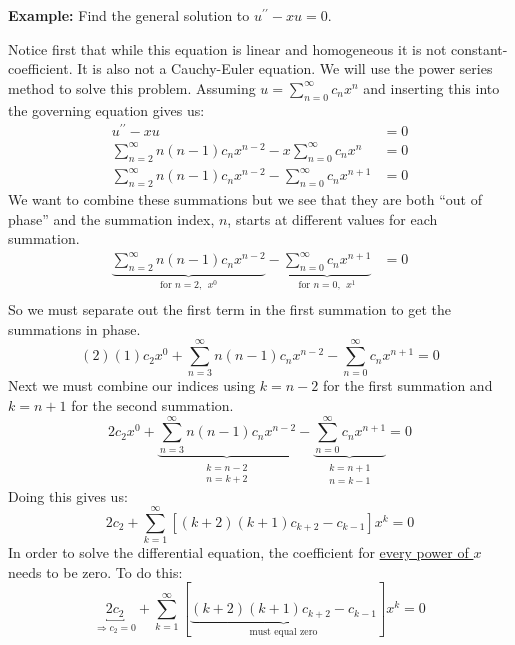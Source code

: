\vspace{3.0cm}
\noindent\textbf{Example:} Find the general solution to $u^{\prime \prime}-xu = 0$.

Notice first that while this equation is linear and homogeneous it is not constant-coefficient.  It is also not a Cauchy-Euler equation.  We will use the power series method to solve this problem.  Assuming $u=\sum_{n=0}^{\infty}c_n x^n$ and inserting this into the governing equation gives us:
\begin{align*}
u^{\prime \prime}-xu &= 0 \\
\sum\limits_{n=2}^{\infty}n(n-1)c_n x^{n-2} - x\sum\limits_{n=0}^{\infty}c_nx^n &= 0 \\
\sum\limits_{n=2}^{\infty}n(n-1)c_n x^{n-2} - \sum\limits_{n=0}^{\infty}c_n x^{n+1} &=0
\end{align*}
We want to combine these summations but we see that they are both ``out of phase'' and the summation index, $n$, starts at different values for each summation.
\begin{align*}
\underbrace{\sum\limits_{n=2}^{\infty}n(n-1)c_n x^{n-2}}_{\text{for }n=2, \ \ x^0} - \underbrace{\sum\limits_{n=0}^{\infty}c_n x^{n+1}}_{\text{for }n=0, \ \ x^1} &=0 \\
\end{align*}
So we must separate out the first term in the first summation to get the summations in phase.
\begin{equation*}
(2)(1)c_2x^0 + \sum\limits_{n=3}^{\infty}n(n-1)c_n x^{n-2} - \sum\limits_{n=0}^{\infty}c_n x^{n+1} = 0
\end{equation*}
Next we must combine our indices using $k=n-2$ for the first summation and $k=n+1$ for the second summation.  
\begin{equation*}
2c_2x^0 + \underbrace{\sum\limits_{n=3}^{\infty}n(n-1)c_n x^{n-2}}_{\substack{k=n-2 \\n=k+2}} - \underbrace{\sum\limits_{n=0}^{\infty}c_n x^{n+1}}_{\substack{k=n+1 \\ n=k-1}} = 0
\end{equation*}
Doing this gives us:
\begin{equation*}
2c_2 + \sum\limits_{k=1}^{\infty} \left[(k+2)(k+1)c_{k+2} - c_{k-1}\right]x^k = 0
\end{equation*}
In order to solve the differential equation, the coefficient for \underline{every power of $x$} needs to be zero.  To do this:
\begin{equation*}
\underbracket{2c_2}_{\Rightarrow c_2=0} + \sum\limits_{k=1}^{\infty} [\underbrace{(k+2)(k+1)c_{k+2} - c_{k-1}}_{\text{must equal zero}}]x^k = 0
\end{equation*}

